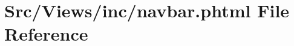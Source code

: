 \hypertarget{navbar_8phtml}{}\section{Src/\+Views/inc/navbar.phtml File Reference}
\label{navbar_8phtml}
